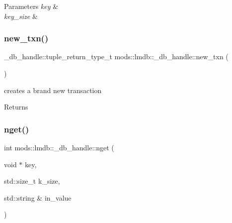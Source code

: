 \begin{DoxyParams}{Parameters}
{\em key} & \\
\hline
{\em key\+\_\+size} & \\
\hline
\end{DoxyParams}
\mbox{\label{structmods_1_1lmdb_1_1__db__handle_a2bed96ee84f6d91bb6bbb0cba95aef0e}} 
\subsubsection{\texorpdfstring{new\+\_\+txn()}{new\_txn()}}
{\footnotesize\ttfamily \+\_\+db\+\_\+handle\+::tuple\+\_\+return\+\_\+type\+\_\+t mods\+::lmdb\+::\+\_\+db\+\_\+handle\+::new\+\_\+txn (\begin{DoxyParamCaption}{ }\end{DoxyParamCaption})}



creates a brand new transaction 

\begin{DoxyReturn}{Returns}

\end{DoxyReturn}
\mbox{\label{structmods_1_1lmdb_1_1__db__handle_a2d6b287c6a1c63139df32e26bd8531cd}} 
\subsubsection{\texorpdfstring{nget()}{nget()}\hspace{0.1cm}{\footnotesize\ttfamily [1/2]}}
{\footnotesize\ttfamily int mods\+::lmdb\+::\+\_\+db\+\_\+handle\+::nget (\begin{DoxyParamCaption}\item[{void $\ast$}]{key,  }\item[{std\+::size\+\_\+t}]{k\+\_\+size,  }\item[{std\+::string \&}]{in\+\_\+value }\end{DoxyParamCaption})}



